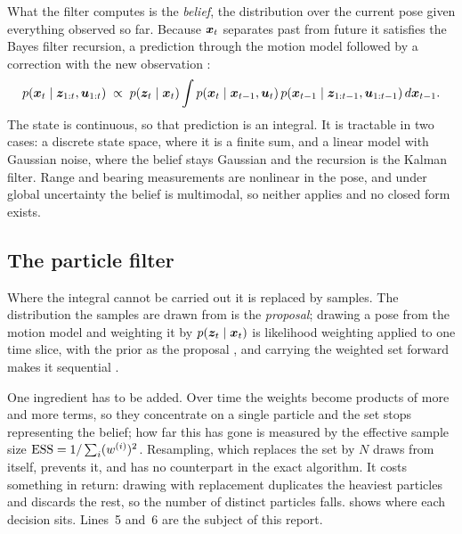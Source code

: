 What the filter computes is the \emph{belief}, the distribution over the current pose given everything observed
so far. Because $\bm{x}_t$ separates past from future it satisfies the Bayes filter recursion, a prediction through
the motion model followed by a correction with the new observation \cite{thrun2005probabilistic}:
\begin{equation}
  p(\bm{x}_t \mid \bm{z}_{1:t}, \bm{u}_{1:t}) \;\propto\; p(\bm{z}_t \mid \bm{x}_t)
  \int p(\bm{x}_t \mid \bm{x}_{t-1}, \bm{u}_t)\, p(\bm{x}_{t-1} \mid \bm{z}_{1:t-1}, \bm{u}_{1:t-1})\, d\bm{x}_{t-1}.
  \label{eq:bayes-filter}
\end{equation}
The state is continuous, so that prediction is an integral. It is tractable in two cases: a discrete state space,
where it is a finite sum, and a linear model with Gaussian noise, where the belief stays Gaussian and the
recursion is the Kalman filter. Range and bearing measurements are nonlinear in the pose, and under global
uncertainty the belief is multimodal, so neither applies and no closed form exists.

\subsection{The particle filter}\label{sec:pf}

Where the integral cannot be carried out it is replaced by samples. The distribution the samples are drawn from
is the \emph{proposal}; drawing a pose from the motion model and weighting it by $p(\bm{z}_t \mid \bm{x}_t)$ is
likelihood weighting applied to one time slice, with the prior as the proposal
\cite[ch.~12]{koller2009probabilistic}, and carrying the weighted set forward makes it sequential
\cite{gordon1993novel,arulampalam2002tutorial}.

One ingredient has to be added. Over time the weights become products of more and more terms, so they concentrate
on a single particle and the set stops representing the belief; how far this has gone is measured by the
effective sample size $\mathrm{ESS} = 1/\sum_i (w^{(i)})^2$. Resampling, which replaces the set by $N$ draws
from itself, prevents it, and has no counterpart in the exact algorithm. It costs something in return: drawing
with replacement duplicates the heaviest particles and discards the rest, so the number of distinct particles
falls.  shows where each decision sits. Lines~5 and~6 are the subject of this report.

